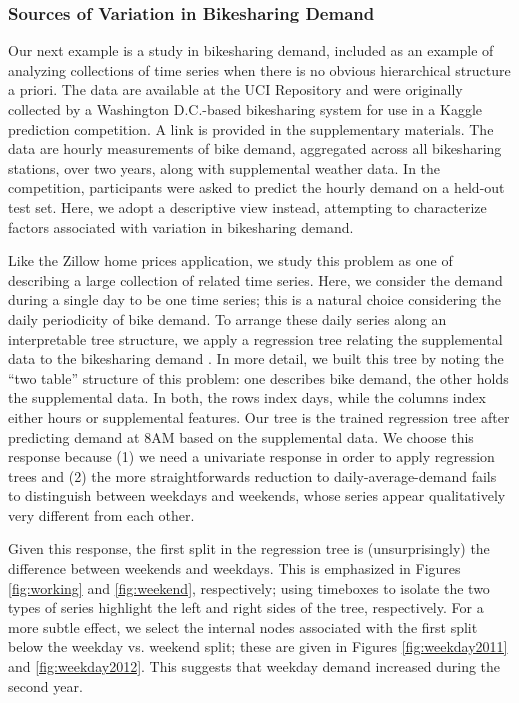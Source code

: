 \subsubsection{Sources of Variation in Bikesharing
Demand}\label{bikesharing-study}

Our next example is a study in bikesharing demand, included as an example of
analyzing collections of time series when there is no obvious hierarchical
structure a priori. The data are available at the UCI Repository and were
originally collected by a Washington D.C.-based bikesharing system for use in a
Kaggle prediction competition. A link is provided in the supplementary
materials. The data are hourly measurements of bike demand, aggregated across
all bikesharing stations, over two years, along with supplemental weather data.
In the competition, participants were asked to predict the hourly demand on a
held-out test set. Here, we adopt a descriptive view instead, attempting to
characterize factors associated with variation in bikesharing demand.

Like the Zillow home prices application, we study this problem as one of
describing a large collection of related time series. Here, we consider
the demand during a single day to be one time series; this is a natural
choice considering the daily periodicity of bike demand. To arrange
these daily series along an interpretable tree structure, we apply a
regression tree relating the supplemental data to the bikesharing demand
\citep{breiman1984classification}. In more
detail, we built this tree by noting the ``two table'' structure of this
problem: one describes bike demand, the other holds the supplemental
data. In both, the rows index days, while the columns index either hours
or supplemental features. Our tree is the trained regression tree after
predicting demand at 8AM based on the supplemental data. We choose this
response because (1) we need a univariate response in order to apply
regression trees and (2) the more straightforwards reduction to
daily-average-demand fails to distinguish between weekdays and weekends,
whose series appear qualitatively very different from each other.

Given this response, the first split in the regression tree is
(unsurprisingly) the difference between weekends and weekdays. This is
emphasized in Figures \ref{fig:working} and \ref{fig:weekend}, respectively;
using timeboxes to isolate the two types of series highlight the left and right
sides of the tree, respectively. For a more subtle effect, we select the
internal nodes associated with the first split below the weekday vs. weekend
split; these are given in Figures \ref{fig:weekday2011} and
\ref{fig:weekday2012}. This suggests that weekday demand increased during the
second year.

